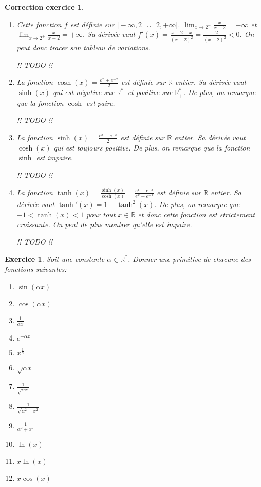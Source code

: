 \documentclass[12pt]{article}
\newtheorem{exercice}{\bf Exercice}
\newtheorem{correction}{\bf Correction exercice}
\newenvironment{exo}{
\begin{exercice}\smallskip\normalfont}{\end{exercice}
}
\newenvironment{cor}{
\begin{correction}\smallskip\normalfont}{\end{correction}
}
\newcommand*{\R}{\mathbb{R}}
\newif\ifcorrige\corrigetrue
\begin{document}
\ifcorrige
\color{magenta}
\begin{cor}
$\qquad$
\begin{enumerate}
\item Cette fonction $f$ est d\'efinie sur $]-\infty,2[\cup]2,+\infty[$.
  $\lim_{x \to 2^-} \frac{x}{x-2} = - \infty$
  et $\lim_{x \to 2^+} \frac{x}{x-2} = + \infty$.
  Sa d\'eriv\'ee vaut
  $f'(x) = \frac{x-2 - x}{(x-2)^2} = \frac{-2}{(x-2)^2} < 0$.
  On peut donc tracer son tableau de variations.

  !! TODO !!

\item La fonction $\cosh(x) = \frac{e^x + e^{-x}}{2}$ est d\'efinie sur $\R$ entier.
  Sa d\'eriv\'ee vaut $\sinh(x)$ qui est n\'egative sur $\R_-^*$ et positive sur $\R_+^*$.
  De plus, on remarque que la fonction $\cosh$ est paire.

  !! TODO !!

\item La fonction $\sinh(x) = \frac{e^x - e^{-x}}{2}$ est d\'efinie sur $\R$ entier.
  Sa d\'eriv\'ee vaut $\cosh(x)$ qui est toujours positive.
  De plus, on remarque que la fonction $\sinh$ est impaire.

  !! TODO !!

\item La fonction $\tanh(x) = \frac{\sinh(x)}{\cosh(x)} = \frac{e^x - e^{-x}}{e^x + e^{-x}}$
  est d\'efinie sur $\R$ entier.
  Sa d\'eriv\'ee vaut $\tanh'(x) = 1 - \tanh^2(x)$.
  De plus, on remarque que $-1 < \tanh(x) < 1$ pour tout $x \in \R$
  et donc cette fonction est strictement croissante.
  On peut de plus montrer qu'elle est impaire.

  !! TODO !!
\end{enumerate}
\end{cor}
\color{black}
\fi



\begin{exo} Soit une constante $\alpha \in \R^*$. Donner une primitive de chacune des fonctions suivantes:
\begin{multicols}{4}
\begin{enumerate}
\item $\sin(\alpha x)$
\item $\cos(\alpha x)$
\item $\frac{1}{\alpha x}$
\item $e^{-\alpha x}$
\item $x^{\frac1{\alpha}}$
\item $\sqrt{\alpha x}$
\item $\frac1{\sqrt{\alpha x}}$
\item $\frac{1}{\sqrt{\alpha^2-x^2}}$
\item $\frac{1}{\alpha^2 + x^2}$
\item $\ln(x)$
\item $x \ln(x)$
\item $x \cos(x)$
\end{enumerate}
\end{multicols}
\end{exo}
\end{document}

